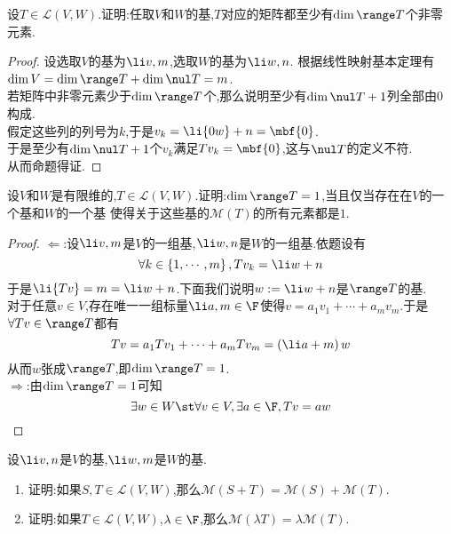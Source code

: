 \documentclass{ctexart}
\begin{document}
\pagestyle{empty}
\begin{center}
    \large{}
\end{center}
\begin{problem}[1.]
    设$T\in\mathcal{L}(V,W)$.证明:任取$V$和$W$的基,$T$对应的矩阵都至少有$\dim\range T$个非零元素.
\end{problem}
\begin{proof}
    设选取$V$的基为$\li v,m$,选取$W$的基为$\li w,n$.
    根据线性映射基本定理有$\dim V=\dim\range T+\dim\nul T=m$.\\
    若矩阵中非零元素少于$\dim\range T$个,那么说明至少有$\dim\nul T+1$列全部由$0$构成.\\
    假定这些列的列号为$k$,于是$v_k=\li {0w}+n=\mbf{0}$.\\
    于是至少有$\dim\nul T+1$个$v_k$满足$Tv_k=\mbf{0}$,这与$\nul T$的定义不符.\\
    从而命题得证.
\end{proof}
\begin{problem}[3.]
    设$V$和$W$是有限维的,$T\in\mathcal{L}(V,W)$.证明:$\dim\range T=1$,当且仅当存在在$V$的一个基和$W$的一个基
    使得关于这些基的$\mathcal{M}(T)$的所有元素都是$1$.
\end{problem}
\begin{proof}
    $\Leftarrow$:设$\li v,m$是$V$的一组基,$\li w,n$是$W$的一组基.依题设有
    $$\forall k\in\left\{1,\cdots,m\right\},Tv_k=\li w+n$$
    于是$\li {Tv}=m=\li w+n$.下面我们说明$w:=\li w+n$是$\range T$的基.\\
    对于任意$v\in V$,存在唯一一组标量$\li a,m\in\F$使得$v=a_1v_1+\cdots+a_mv_m$.于是$\forall Tv\in\range T$都有
    $$Tv=a_1Tv_1+\cdots+a_mTv_m=\left(\li a+m\right)w$$
    从而$w$张成$\range T$,即$\dim\range T=1$.\\
    $\Rightarrow$:由$\dim\range T=1$可知
    $$\exists w\in W\st\forall v\in V,\exists a\in\F,Tv=aw$$
    
\end{proof}
\begin{problem}[3.]
    设$\li v,n$是$V$的基,$\li w,m$是$W$的基.
    \begin{enumerate}[label=\tbf{(\arabic*)}]
        \item 证明:如果$S,T\in\mathcal{L}(V,W)$,那么$\mathcal{M}(S+T)=\mathcal{M}(S)+\mathcal{M}(T)$.
        \item 证明:如果$T\in\mathcal{L}(V,W)$,$\lambda\in\F$,那么$\mathcal{M}(\lambda T)=\lambda\mathcal{M}(T)$.
    \end{enumerate}
\end{problem}
\end{document}
